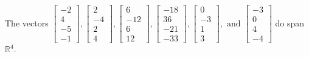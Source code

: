 \begin{exercise}
\begin{exerciseStatement}
  \end{exerciseStatement}
  \begin{exerciseAnswer}
   The vectors \(\left[\begin{array}{r}
-2 \\
4 \\
-5 \\
-1
\end{array}\right] , \left[\begin{array}{r}
2 \\
-4 \\
2 \\
4
\end{array}\right] , \left[\begin{array}{r}
6 \\
-12 \\
6 \\
12
\end{array}\right] , \left[\begin{array}{r}
-18 \\
36 \\
-21 \\
-33
\end{array}\right] , \left[\begin{array}{r}
0 \\
-3 \\
1 \\
3
\end{array}\right] , \text{ and } \left[\begin{array}{r}
-3 \\
0 \\
4 \\
-4
\end{array}\right]\) 
  	 do  
	span \(\mathbb{R}^4\).
  


  \end{exerciseAnswer}
\end{exercise}